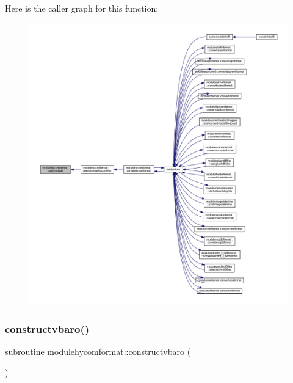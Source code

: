 Here is the caller graph for this function\+:\nopagebreak
\begin{figure}[H]
\begin{center}
\leavevmode
\includegraphics[width=350pt]{namespacemodulehycomformat_a9e6467cf7daa8b6be0aef68805d1ab7c_icgraph}
\end{center}
\end{figure}
\mbox{\label{namespacemodulehycomformat_a26be9ece61892ddfd2166afbb12b8b28}} 
\subsubsection{\texorpdfstring{constructvbaro()}{constructvbaro()}}
{\footnotesize\ttfamily subroutine modulehycomformat\+::constructvbaro (\begin{DoxyParamCaption}{ }\end{DoxyParamCaption})\hspace{0.3cm}{\ttfamily [private]}}

